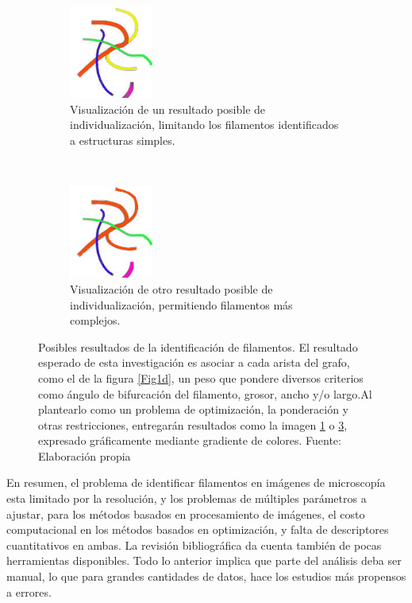 \documentclass{article}
\begin{document}
\begin{figure}[h]
    \begin{subfigure}[t]{0.5\textwidth}
        \centering
        \includegraphics[height=1.2in]{define-weighted-4-expected2.png}
        \caption{Visualizaci\'on de un resultado posible de individualizaci\'on, limitando los filamentos identificados a estructuras simples.}
        \label{Fig2a}
    \end{subfigure}%
    ~ 
    \begin{subfigure}[t]{0.5\textwidth}
        \centering
        \includegraphics[height=1.2in]{define-weighted-4-expected1.png}
        \caption{Visualizaci\'on de otro resultado posible de individualizaci\'on, permitiendo filamentos m\'as complejos.}
        \label{Fig2b}
    \end{subfigure}
	\caption{Posibles resultados de la identificaci\'on de filamentos. El resultado esperado de esta investigaci\'on es asociar a cada arista del grafo, como el de la figura \ref{Fig1d}, un peso que pondere diversos criterios como \'angulo de bifurcaci\'on del filamento, grosor, ancho y/o largo.Al plantearlo como un problema de optimizaci\'on, la ponderaci\'on y otras restricciones, entregar\'an resultados como la imagen \ref{Fig2a} o \ref{Fig2b}, expresado gr\'aficamente mediante gradiente de colores. Fuente: Elaboraci\'on propia}
\end{figure}

En resumen, el problema de identificar filamentos en im\'agenes de microscop\'ia esta limitado por la resoluci\'on, y los problemas de m\'ultiples par\'ametros a ajustar, para los m\'etodos basados en procesamiento de im\'agenes, el costo computacional en los m\'etodos basados en optimizaci\'on, y falta de descriptores cuantitativos en ambas. La revisi\'on bibliogr\'afica da cuenta tambi\'en de pocas herramientas disponibles. Todo lo anterior implica que parte del an\'alisis deba ser manual, lo que para grandes cantidades de datos, hace los estudios m\'as propensos a errores. 
\end{document}
